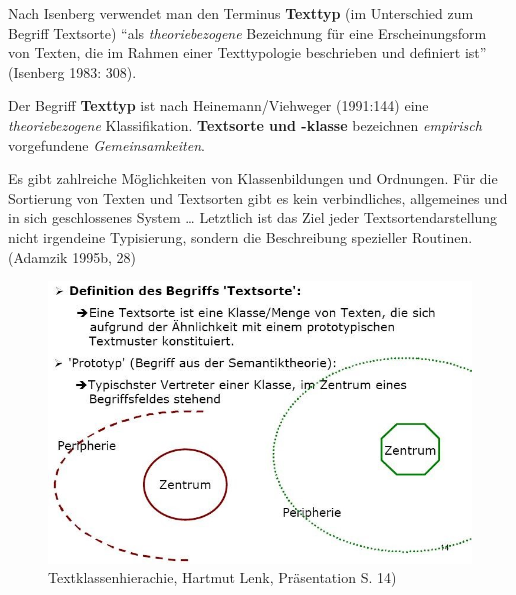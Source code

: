 \documentclass[
  letterpaper,
]{scrbook}
\begin{document}
Nach Isenberg verwendet man den Terminus \textbf{Texttyp} (im
Unterschied zum Begriff Textsorte) ``als \emph{theoriebezogene}
Bezeichnung für eine Erscheinungsform von Texten, die im Rahmen einer
Texttypologie beschrieben und definiert ist'' (Isenberg 1983: 308).

Der Begriff \textbf{Texttyp} ist nach Heinemann/Viehweger (1991:144)
eine \emph{theoriebezogene} Klassifikation. \textbf{Textsorte und
-klasse} bezeichnen \emph{empirisch} vorgefundene
\emph{Gemeinsamkeiten}.

Es gibt zahlreiche Möglichkeiten von Klassenbildungen und Ordnungen. Für
die Sortierung von Texten und Textsorten gibt es kein verbindliches,
allgemeines und in sich geschlossenes System \ldots{} Letztlich ist das
Ziel jeder Textsortendarstellung nicht irgendeine Typisierung, sondern
die Beschreibung spezieller Routinen. (Adamzik 1995b, 28)

\begin{figure}

{\centering \includegraphics[width=1\textwidth,height=\textheight]{./pictures/textsortenprototypen.jpg}

}

\caption{Textklassenhierachie, Hartmut Lenk, Präsentation S. 14)}

\end{figure}
\end{document}
